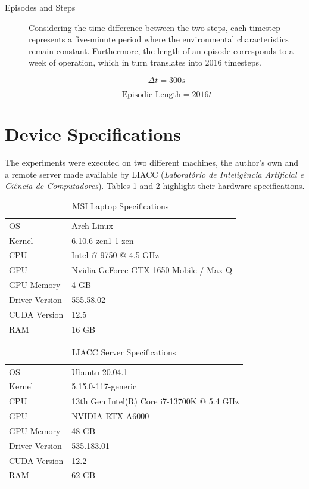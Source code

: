 \begin{description}
	
	\item[Episodes and Steps] Considering the time difference between the two steps, each timestep represents a five-minute period where the environmental characteristics remain constant. Furthermore, the length of an episode corresponds to a week of operation, which in turn translates into 2016 timesteps. \par

	
	\begin{equation}
		\Delta t = 300 s
	\end{equation}
	
	\begin{equation}
		\text{Episodic Length} = 2016 t
	\end{equation}
	
\end{description}

\section{Device Specifications} \label{sec:method-specs}

The experiments were executed on two different machines, the author's own and a remote server made available by LIACC (\textit{Laboratório de Inteligência Artificial e Ciência de Computadores}). Tables \ref{tab:specs-msi} and \ref{tab:specs-liacc} highlight their hardware specifications.

\begin{table} 
	\begin{tabular}{|l|l|}
		\hline
		OS & Arch Linux \\
		Kernel & 6.10.6-zen1-1-zen \\
		CPU & Intel i7-9750 @ 4.5 GHz \\
		GPU & Nvidia GeForce GTX 1650 Mobile / Max-Q \\
		GPU Memory & 4 GB  \\
		Driver Version & 555.58.02 \\
		CUDA Version & 12.5 \\
		RAM & 16 GB \\
		\hline
	\end{tabular}
\caption{MSI Laptop Specifications}
\label{tab:specs-msi}
\end{table}

\begin{table} 
	\begin{tabular}{|l|l|}
		\hline
		OS & Ubuntu 20.04.1 \\
		Kernel & 5.15.0-117-generic \\
		CPU & 13th Gen Intel(R) Core i7-13700K @ 5.4 GHz \\
		GPU & NVIDIA RTX A6000 \\
		GPU Memory & 48 GB \\
		Driver Version & 535.183.01 \\
		CUDA Version & 12.2 \\
		RAM & 62 GB \\
		\hline
\end{tabular}
\caption{LIACC Server Specifications}
\label{tab:specs-liacc}
\end{table}

